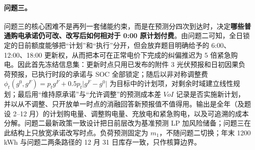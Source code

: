 
\paragraph{问题三。}
问题三的核心困难不是再列一套储能约束，而是在预测分四次到达时，决定\textbf{哪些普通购电承诺仍可改、改写后如何相对于 0:00 原计划付费}。由问题二可知，全日锁定的日前额度能够把“计划”和“执行”分开，但会放弃题目明确给予的 6:00、12:00、18:00 更新权，从而把本可在正常电价下完成的纠偏推迟为 5 倍紧急购电。因此首先冻结信息集：更新时点只用已发布的附件 3 光伏预报和日初因果负荷预报，已执行时段的承诺与 SOC 全部锁定；随后以非对称调整费 \(\phi_t(g^0,g^F)=p_tg^F+0.5p_t\lvert g^F-g^0\rvert\) 为目标中的计划项，对剩余时域建立线性规划；最后用“维持原承诺”与“允许调整”的预测成本差 \(VoI\) 记录是否实施新计划，并以从不调整、只开放单一时点的消融回答新预报值不值得用。输出是全年（及题设 2--12 月）的计划购电量、调整购电量、充放电和紧急购电，以及可追溯的成本分解。问题二最新政策一致设计把日前层改为基准预测 LP 加风险储备；问题三在此结构上只放宽承诺改写时点。负荷预测固定为 \(m_1\)，不随问题二切换；年末 1200 kWh 与问题二两条路径的 12 月 31 日库存一致，只作核算边界。

